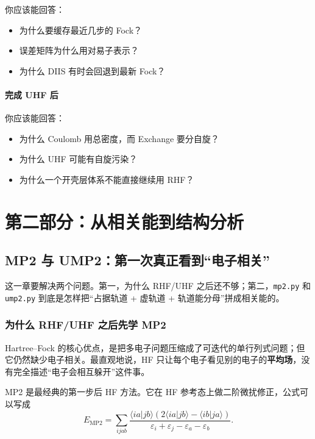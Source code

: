 \documentclass[UTF8,11pt,fontset=fandol]{ctexbook}
\begin{document}
你应该能回答：
\begin{itemize}
  \item 为什么要缓存最近几步的 Fock？
  \item 误差矩阵为什么用对易子表示？
  \item 为什么 DIIS 有时会回退到最新 Fock？
\end{itemize}

\subsection*{完成 UHF 后}

你应该能回答：
\begin{itemize}
  \item 为什么 Coulomb 用总密度，而 Exchange 要分自旋？
  \item 为什么 UHF 可能有自旋污染？
  \item 为什么一个开壳层体系不能直接继续用 RHF？
\end{itemize}

\part{第二部分：从相关能到结构分析}

\chapter{MP2 与 UMP2：第一次真正看到“电子相关”}

\begin{goalbox}[本章目标]
这一章要解决两个问题。第一，为什么 RHF/UHF 之后还不够；第二，\texttt{mp2.py} 和 \texttt{ump2.py} 到底是怎样把“占据轨道 + 虚轨道 + 轨道能分母”拼成相关能的。
\end{goalbox}

\section{为什么 RHF/UHF 之后先学 MP2}

Hartree--Fock 的核心优点，是把多电子问题压缩成了可迭代的单行列式问题；但它仍然缺少电子相关。最直观地说，HF 只让每个电子看见别的电子的\textbf{平均场}，没有完全描述“电子会相互躲开”这件事。

MP2 是最经典的第一步后 HF 方法。它在 HF 参考态上做二阶微扰修正，公式可以写成
\begin{equation}
E_{\mathrm{MP2}}
=
\sum_{ijab}
\frac{\langle ia|jb\rangle \left(2\langle ia|jb\rangle-\langle ib|ja\rangle\right)}
{\varepsilon_i+\varepsilon_j-\varepsilon_a-\varepsilon_b}.
\end{equation}
\end{document}
